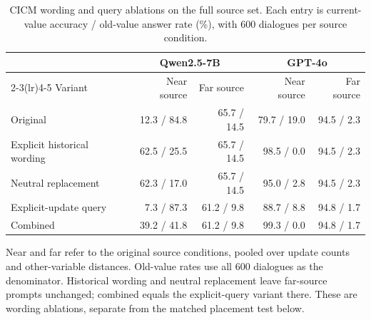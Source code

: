 \begin{table}[htbp]
\centering
\small
\setlength{\tabcolsep}{4pt}
\caption{CICM wording and query ablations on the full source set. Each entry is current-value accuracy / old-value answer rate (\%), with 600 dialogues per source condition.}
\label{tab:revision-cicm-wording}
\begin{tabularx}{\textwidth}{@{}Xrrrr@{}}
\toprule
& \multicolumn{2}{c}{Qwen2.5-7B} & \multicolumn{2}{c}{GPT-4o} \\
\cmidrule(lr){2-3}\cmidrule(lr){4-5}
Variant & Near source & Far source & Near source & Far source \\
\midrule
Original & 12.3 / 84.8 & 65.7 / 14.5 & 79.7 / 19.0 & 94.5 / 2.3 \\
Explicit historical wording & 62.5 / 25.5 & 65.7 / 14.5 & 98.5 / 0.0 & 94.5 / 2.3 \\
Neutral replacement & 62.3 / 17.0 & 65.7 / 14.5 & 95.0 / 2.8 & 94.5 / 2.3 \\
Explicit-update query & 7.3 / 87.3 & 61.2 / 9.8 & 88.7 / 8.8 & 94.8 / 1.7 \\
Combined & 39.2 / 41.8 & 61.2 / 9.8 & 99.3 / 0.0 & 94.8 / 1.7 \\
\bottomrule
\end{tabularx}
\vspace{3pt}\parbox{\linewidth}{\footnotesize Near and far refer to the original source conditions, pooled over update counts and other-variable distances. Old-value rates use all 600 dialogues as the denominator. Historical wording and neutral replacement leave far-source prompts unchanged; combined equals the explicit-query variant there. These are wording ablations, separate from the matched placement test below.}
\end{table}
